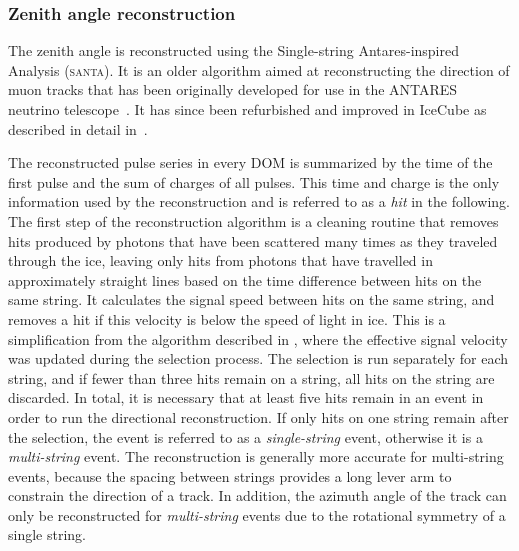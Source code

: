 \subsubsection{Zenith angle reconstruction}
\label{sec:santa}
The zenith angle is reconstructed using the Single-string Antares-inspired Analysis (\textsc{santa}). It is an older algorithm aimed at reconstructing the direction of muon tracks that has been originally developed for use in the ANTARES neutrino telescope~. It has since been refurbished and improved in IceCube as described in detail in~.

The reconstructed pulse series in every DOM is summarized by the time of the first pulse and the sum of charges of all pulses. This time and charge is the only information used by the reconstruction and is referred to as a \emph{hit} in the following. The first step of the reconstruction algorithm is a cleaning routine that removes hits produced
by photons that have been scattered many times as they traveled
through the ice, leaving only hits from photons that have travelled in approximately straight lines based on the time difference between hits on the same string.
It calculates the signal speed between hits on the same string, and removes a hit if this velocity is below the speed of light in ice. This is a simplification from the algorithm described in \cite{Garza2014Measurement}, where the effective signal velocity was updated during the selection process. The selection is run separately for each string, and if fewer than three hits remain on a string, all hits on the string are discarded. In total, it is necessary that at least five hits remain in an event in order to run the directional reconstruction. If only hits on one string remain after the selection, the event is referred to as a \emph{single-string} event, otherwise it is a \emph{multi-string} event. The reconstruction is generally more accurate for multi-string events, because the spacing between strings provides a long lever arm to constrain the direction of a track. In addition, the azimuth angle of the track can only be reconstructed for \emph{multi-string} events due to the rotational symmetry of a single string.

